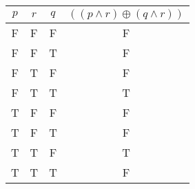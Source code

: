 \begin{tabular}{|c|c|c||c|}
\hline
$ p $ & $ r $ & $ q $ & $ ((p \wedge r) \oplus (q \wedge r)) $ \\
\hline
F & F & F & F \\
F & F & T & F \\
F & T & F & F \\
F & T & T & T \\
T & F & F & F \\
T & F & T & F \\
T & T & F & T \\
T & T & T & F \\
\hline
\end{tabular}
\label{table:tt1}
